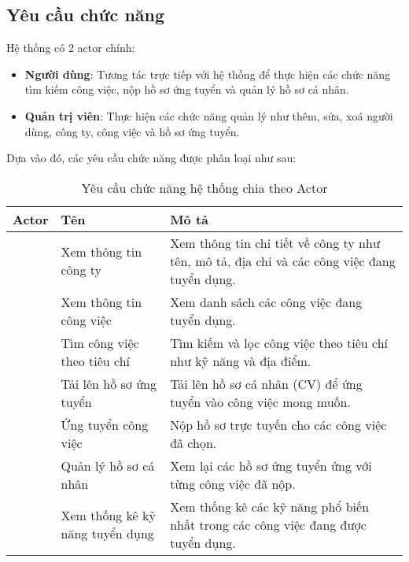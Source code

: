 \subsection{Yêu cầu chức năng}

Hệ thống có 2 actor chính:
\begin{itemize}
    \item \textbf{Người dùng}: Tương tác trực tiếp với hệ thống để thực hiện các chức năng tìm kiếm công việc, nộp hồ sơ ứng tuyển và quản lý hồ sơ cá nhân.
    \item \textbf{Quản trị viên}: Thực hiện các chức năng quản lý như thêm, sửa, xoá người dùng, công ty, công việc và hồ sơ ứng tuyển.
\end{itemize}

Dựa vào đó, các yêu cầu chức năng được phân loại như sau:
\begin{table}[H]
\centering
\caption{Yêu cầu chức năng hệ thống chia theo Actor}
\renewcommand{\arraystretch}{1.5} %
\begin{tabular}{|>{\centering\arraybackslash}m{3cm}|>{\centering\arraybackslash}m{4cm}|m{7cm}|}
\hline
\textbf{Actor} & \textbf{Tên}                        & \textbf{Mô tả}                                                                                  \\ \hline
\multirow{7}{*}{\textbf{Người dùng}}
 & Xem thông tin công ty           & Xem thông tin chi tiết về công ty như tên, mô tả, địa chỉ và các công việc đang tuyển dụng.      \\ \cline{2-3}
 & Xem thông tin công việc         & Xem danh sách các công việc đang tuyển dụng.                                                     \\ \cline{2-3}
 & Tìm công việc theo tiêu chí     & Tìm kiếm và lọc công việc theo tiêu chí như kỹ năng và địa điểm.                                 \\ \cline{2-3}
 & Tải lên hồ sơ ứng tuyển         & Tải lên hồ sơ cá nhân (CV) để ứng tuyển vào công việc mong muốn.                                 \\ \cline{2-3}
 & Ứng tuyển công việc             & Nộp hồ sơ trực tuyến cho các công việc đã chọn.                                                  \\ \cline{2-3}
 & Quản lý hồ sơ cá nhân           & Xem lại các hồ sơ ứng tuyển ứng với từng công việc đã nộp.                                       \\ \cline{2-3}
 & Xem thống kê kỹ năng tuyển dụng & Xem thống kê các kỹ năng phổ biến nhất trong các công việc đang được tuyển dụng.                 \\ \hline

\end{tabular}
\end{table}
